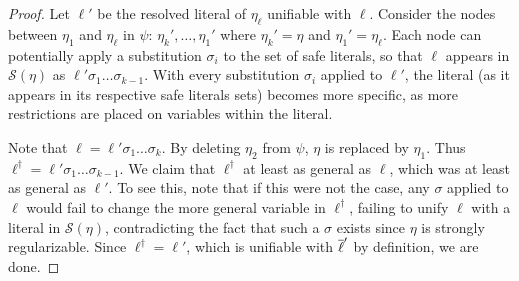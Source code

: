 \begin{proof}
Let $\ell'$ be the resolved literal of $\eta_\ell$ unifiable with $\ell$. Consider the nodes between $\eta_1$ and $\eta_\ell$ in $\psi$: $\eta_k',\ldots,\eta_1'$ where $\eta_k'=\eta$ and $\eta_1'=\eta_\ell$. Each node can potentially apply a substitution $\sigma_i$ to the set of safe literals, so that $\ell$ appears in $\mathcal{S}(\eta)$ as $\ell'\sigma_1\dots\sigma_{k-1}$. With every substitution $\sigma_i$ applied to $\ell'$, the literal (as it appears in its respective safe literals sets) becomes more specific, as more restrictions are placed on variables within the literal. 

Note that  $\ell=\ell'\sigma_1\dots\sigma_k$. By deleting $\eta_2$ from $\psi$, $\eta$ is replaced by $\eta_1$. Thus $\ell^\dagger =  \ell'\sigma_1\dots\sigma_{k-1}$. We claim that $\ell^\dagger$ at least as general as $\ell$, which was at least as general as $\ell'$. To see this, note that if this were not the case, any $\sigma$ applied to $\ell$ would fail to change the more general variable in $\ell^\dagger$, failing to unify $\ell$ with a literal in $\mathcal{S}(\eta)$, contradicting the fact that such a $\sigma$ exists since $\eta$ is strongly regularizable. Since $\ell^\dagger = \ell'$, which is unifiable with $\overline{\ell}'$ by definition, we are done.




\end{proof}


